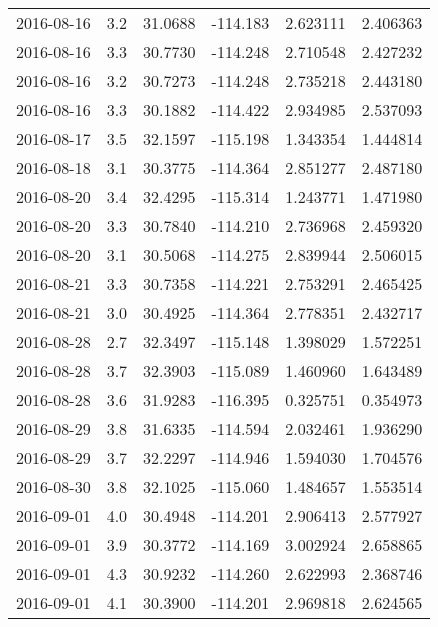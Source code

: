 \begin{tabular}{lrrrrr}
2016-08-16 &       3.2 &  31.0688 &  -114.183 &         2.623111 &         2.406363 \\
2016-08-16 &       3.3 &  30.7730 &  -114.248 &         2.710548 &         2.427232 \\
2016-08-16 &       3.2 &  30.7273 &  -114.248 &         2.735218 &         2.443180 \\
2016-08-16 &       3.3 &  30.1882 &  -114.422 &         2.934985 &         2.537093 \\
2016-08-17 &       3.5 &  32.1597 &  -115.198 &         1.343354 &         1.444814 \\
2016-08-18 &       3.1 &  30.3775 &  -114.364 &         2.851277 &         2.487180 \\
2016-08-20 &       3.4 &  32.4295 &  -115.314 &         1.243771 &         1.471980 \\
2016-08-20 &       3.3 &  30.7840 &  -114.210 &         2.736968 &         2.459320 \\
2016-08-20 &       3.1 &  30.5068 &  -114.275 &         2.839944 &         2.506015 \\
2016-08-21 &       3.3 &  30.7358 &  -114.221 &         2.753291 &         2.465425 \\
2016-08-21 &       3.0 &  30.4925 &  -114.364 &         2.778351 &         2.432717 \\
2016-08-28 &       2.7 &  32.3497 &  -115.148 &         1.398029 &         1.572251 \\
2016-08-28 &       3.7 &  32.3903 &  -115.089 &         1.460960 &         1.643489 \\
2016-08-28 &       3.6 &  31.9283 &  -116.395 &         0.325751 &         0.354973 \\
2016-08-29 &       3.8 &  31.6335 &  -114.594 &         2.032461 &         1.936290 \\
2016-08-29 &       3.7 &  32.2297 &  -114.946 &         1.594030 &         1.704576 \\
2016-08-30 &       3.8 &  32.1025 &  -115.060 &         1.484657 &         1.553514 \\
2016-09-01 &       4.0 &  30.4948 &  -114.201 &         2.906413 &         2.577927 \\
2016-09-01 &       3.9 &  30.3772 &  -114.169 &         3.002924 &         2.658865 \\
2016-09-01 &       4.3 &  30.9232 &  -114.260 &         2.622993 &         2.368746 \\
2016-09-01 &       4.1 &  30.3900 &  -114.201 &         2.969818 &         2.624565 \\

\end{tabular}

